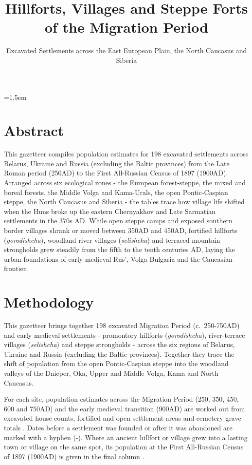 \IfFileExists{../../_shared/template/intellte.cls}{\documentclass[10pt,onecolumn]{../../_shared/template/intellte}}{\documentclass[10pt,onecolumn]{intellte}}
\title{Hillforts, Villages and Steppe Forts of the Migration Period}
\subtitle{Excavated Settlements across the East European Plain, the
North Caucasus and Siberia}
\begin{document}
\makeatletter
\ifdefined\crd@orig@hyper@linkurl
  \let\hyper@linkurl\crd@orig@hyper@linkurl
\fi
\makeatother
{}
\emergencystretch=1.5em


\maketitle
\pagestyle{empty}
\thispagestyle{empty}

\section{Abstract}\label{abstract}

This gazetteer compiles population estimates for 198 excavated
settlements across Belarus, Ukraine and Russia (excluding the Baltic
provinces) from the Late Roman period (250AD) to the First All-Russian
Census of 1897 (1900AD). Arranged across six ecological zones - the
European forest-steppe, the mixed and boreal forests, the Middle Volga
and Kama-Urals, the open Pontic-Caspian steppe, the North Caucasus and
Siberia - the tables trace how village life shifted when the Huns broke
up the eastern Chernyakhov and Late Sarmatian settlements in the 370s
AD. While open steppe camps and exposed southern border villages shrank
or moved between 350AD and 450AD, fortified hillforts
(\emph{gorodishcha}), woodland river villages (\emph{selishcha}) and
terraced mountain strongholds grew steadily from the fifth to the tenth
centuries AD, laying the urban foundations of early medieval Rus', Volga
Bulgaria and the Caucasian frontier.

\section{Methodology}\label{methodology}

This gazetteer brings together 198 excavated Migration Period
(c.~250-750AD) and early medieval settlements - promontory hillforts
(\emph{gorodishcha}), river-terrace villages (\emph{selishcha}) and
steppe strongholds - across the six regions of Belarus, Ukraine and
Russia (excluding the Baltic provinces). Together they trace the shift
of population from the open Pontic-Caspian steppe into the woodland
valleys of the Dnieper, Oka, Upper and Middle Volga, Kama and North
Caucasus.

For each site, population estimates across the Migration Period (250,
350, 450, 600 and 750AD) and the early medieval transition (900AD) are
worked out from excavated house counts, fortified and open settlement
areas and cemetery grave totals
.
Dates before a settlement was founded or after it was abandoned are
marked with a hyphen (-). Where an ancient hillfort or village grew into
a lasting town or village on the same spot, its population at the First
All-Russian Census of 1897 (1900AD) is given in the final column
.
\end{document}
